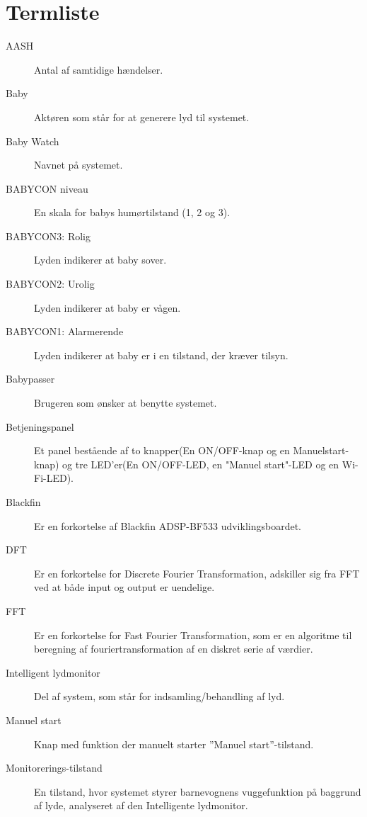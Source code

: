 \chapter{Termliste}


\begin{description}
\item[AASH] Antal af samtidige hændelser.
\item[Baby] Aktøren som står for at generere lyd til systemet.
\item[Baby Watch] Navnet på systemet.
\item[BABYCON niveau] En skala for babys humørtilstand (1, 2 og 3).
\item[BABYCON3: Rolig] Lyden indikerer at baby sover.
\item[BABYCON2: Urolig] Lyden indikerer at baby er vågen.
\item[BABYCON1: Alarmerende] Lyden indikerer at baby er i en tilstand, der kræver tilsyn.
\item[Babypasser] Brugeren som ønsker at benytte systemet.
\item[Betjeningspanel]Et panel bestående af to knapper(En ON/OFF-knap og en Manuelstart-knap) og tre LED'er(En ON/OFF-LED, en "Manuel start"-LED og en Wi-Fi-LED).
\item[Blackfin] Er en forkortelse af Blackfin ADSP-BF533 udviklingsboardet.
\item[DFT] Er en forkortelse for Discrete Fourier Transformation, adskiller sig fra FFT ved at både input og output er uendelige. 
\item[FFT] Er en forkortelse for Fast Fourier Transformation, som er en algoritme til beregning af fouriertransformation af en diskret serie af værdier. 
\item[Intelligent lydmonitor] Del af system, som står for indsamling/behandling af lyd.
\item[Manuel start] Knap med funktion der manuelt starter ''Manuel start''-tilstand.
\item[Monitorerings-tilstand] En tilstand, hvor systemet styrer barnevognens vuggefunktion på baggrund af lyde, analyseret af den Intelligente lydmonitor.

\end{description}
